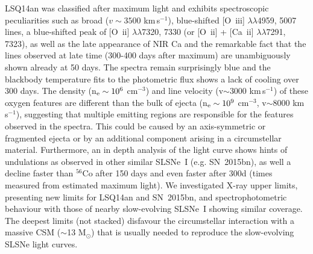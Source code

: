 \documentclass[useAMS,usenatbib]{mn2e}
\def\kms{km\,s$^{-1}$}
\def\co{$^{56}$Co}
\def\M{M$_{\odot}$}
\def\an{LSQ14an}
\def\oiii{[O~{\sc iii}]}
\begin{document}
LSQ14an was classified after maximum light and exhibits spectroscopic peculiarities such as broad ($v\sim3500$ \kms), blue-shifted \oiii\/ $\lambda\lambda$4959, 5007 lines, a blue-shifted peak of [O~{\sc ii}] $\lambda\lambda$7320, 7330 (or [O~{\sc ii}] + [Ca~{\sc ii}] $\lambda\lambda$7291, 7323), as well as the late appearance of NIR Ca and the remarkable fact that the lines observed at late time (300-400 days after maximum) are unambiguously shown already at 50 days. The spectra 
remain surprisingly blue and the blackbody temperature fits to the photometric flux shows a lack of cooling over 300 days.
The density (n$_{\rm e}\sim10^6$ cm$^{-3}$) and line velocity (v$\sim3000$ \kms) of these oxygen features are different than the bulk of ejecta (n$_{\rm e}\sim10^9$ cm$^{-3}$, v$\sim$8000 \kms), suggesting that multiple emitting regions are responsible for the features observed in the spectra.  This could be caused by an axis-symmetric or fragmented ejecta or by an additional component arising in a circumstellar material.
Furthermore, an in depth analysis of the light curve shows hints of undulations as observed in other similar SLSNe~I (e.g. SN~2015bn), as well a decline faster than \co\/ after 150 days and even faster after 300d (times measured from estimated maximum light). We investigated X-ray upper limits, presenting new limits for \an\/ and SN~2015bn, and spectrophotometric behaviour with those of nearby slow-evolving SLSNe~I showing similar coverage. The deepest limits (not stacked) disfavour the circumstellar interaction with a massive CSM ($\sim$13 \M) that is usually needed to reproduce the slow-evolving SLSNe light curves.
\end{document}
